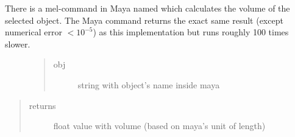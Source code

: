 \documentclass[letterpaper,10pt,english]{sphinxmanual}
\begin{document}
There is a mel-command in Maya named  which calculates the volume of the selected object. The Maya command returns the exact same result (except numerical error \(< 10^{-5}\)) as this implementation but runs roughly 100 times slower.
\begin{description}
\item[{}] \leavevmode\begin{quote}\begin{description}
\item[{obj}] \leavevmode
string with object’s name inside maya

\end{description}\end{quote}

\end{description}
\begin{quote}\begin{description}
\item[{returns}] \leavevmode
float value with volume (based on maya’s unit of length)

\end{description}\end{quote}
\begin{description}
\item[{}] \leavevmode
\begin{sphinxVerbatim}[commandchars=\\\{\}]
            
     
     
   
\end{sphinxVerbatim}

\end{description}
\end{document}
